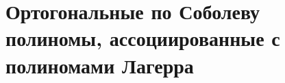 \chapter{Ортогональные по Соболеву полиномы, ассоциированные с полиномами Лагерра}

\cite{Tref1, Tref2, SolDmEg, Pash}
%
